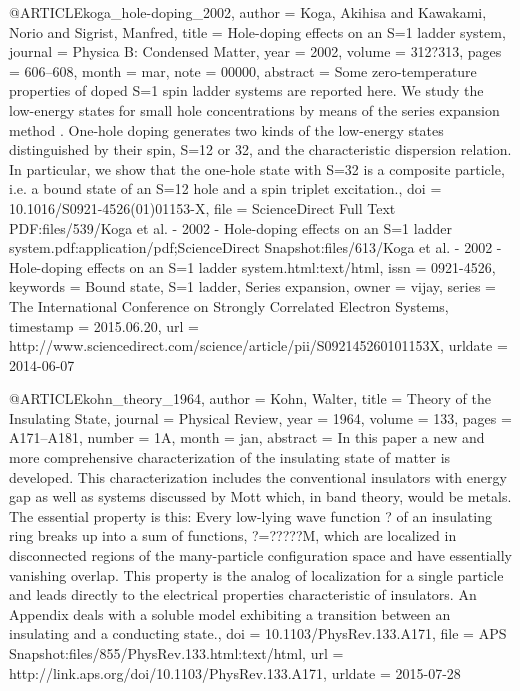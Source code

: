 @ARTICLE{koga_hole-doping_2002,
  author = {Koga, Akihisa and Kawakami, Norio and Sigrist, Manfred},
  title = {Hole-doping effects on an {S}=1 ladder system},
  journal = {Physica B: Condensed Matter},
  year = {2002},
  volume = {312?313},
  pages = {606--608},
  month = mar,
  note = {00000},
  abstract = {Some zero-temperature properties of doped S=1 spin ladder systems
	are reported here. We study the low-energy states for small hole
	concentrations by means of the series expansion method . One-hole
	doping generates two kinds of the low-energy states distinguished
	by their spin, S=12 or 32, and the characteristic dispersion relation.
	In particular, we show that the one-hole state with S=32 is a composite
	particle, i.e. a bound state of an S=12 hole and a spin triplet excitation.},
  doi = {10.1016/S0921-4526(01)01153-X},
  file = {ScienceDirect Full Text PDF:files/539/Koga et al. - 2002 - Hole-doping effects on an S=1 ladder system.pdf:application/pdf;ScienceDirect Snapshot:files/613/Koga et al. - 2002 - Hole-doping effects on an S=1 ladder system.html:text/html},
  issn = {0921-4526},
  keywords = {Bound state, S=1 ladder, Series expansion},
  owner = {vijay},
  series = {The {International} {Conference} on {Strongly} {Correlated} {Electron}
	{Systems}},
  timestamp = {2015.06.20},
  url = {http://www.sciencedirect.com/science/article/pii/S092145260101153X},
  urldate = {2014-06-07}
}

@ARTICLE{kohn_theory_1964,
  author = {Kohn, Walter},
  title = {Theory of the {Insulating} {State}},
  journal = {Physical Review},
  year = {1964},
  volume = {133},
  pages = {A171--A181},
  number = {1A},
  month = jan,
  abstract = {In this paper a new and more comprehensive characterization of the
	insulating state of matter is developed. This characterization includes
	the conventional insulators with energy gap as well as systems discussed
	by Mott which, in band theory, would be metals. The essential property
	is this: Every low-lying wave function ? of an insulating ring breaks
	up into a sum of functions, ?=?????M, which are localized in disconnected
	regions of the many-particle configuration space and have essentially
	vanishing overlap. This property is the analog of localization for
	a single particle and leads directly to the electrical properties
	characteristic of insulators. An Appendix deals with a soluble model
	exhibiting a transition between an insulating and a conducting state.},
  doi = {10.1103/PhysRev.133.A171},
  file = {APS Snapshot:files/855/PhysRev.133.html:text/html},
  url = {http://link.aps.org/doi/10.1103/PhysRev.133.A171},
  urldate = {2015-07-28}
}

